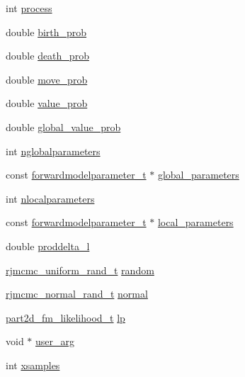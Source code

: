 \begin{DoxyCompactItemize}
\item 
int \hyperlink{structpart2dfm_af7c2d037e638e6ee8bfee2ba6af2463e}{process}
\item 
double \hyperlink{structpart2dfm_a2c88075803d90fecbd53ccc1d6dbc099}{birth\+\_\+prob}
\item 
double \hyperlink{structpart2dfm_a4f2ef201a4e7ea4b716b9a76cf04fa99}{death\+\_\+prob}
\item 
double \hyperlink{structpart2dfm_a45be675d3183f4a00bc9879c84891791}{move\+\_\+prob}
\item 
double \hyperlink{structpart2dfm_a209cacc592d391a9d18ed7efa7caaf8e}{value\+\_\+prob}
\item 
double \hyperlink{structpart2dfm_ad6751334d607033e39894444b680b37b}{global\+\_\+value\+\_\+prob}
\item 
int \hyperlink{structpart2dfm_a88681cdaf686ff60bd2f7b1313cc089f}{nglobalparameters}
\item 
const \hyperlink{forwardmodelparameter_8h_a18a7d2fd51fab097145725d83ac328e3}{forwardmodelparameter\+\_\+t} $\ast$ \hyperlink{structpart2dfm_afa1305d51cc45376446343fb6451d29f}{global\+\_\+parameters}
\item 
int \hyperlink{structpart2dfm_a0142966417b347b4ca7092912355ff8b}{nlocalparameters}
\item 
const \hyperlink{forwardmodelparameter_8h_a18a7d2fd51fab097145725d83ac328e3}{forwardmodelparameter\+\_\+t} $\ast$ \hyperlink{structpart2dfm_a74ce0287c6c2cea1fb4b4e8bf310392f}{local\+\_\+parameters}
\item 
double \hyperlink{structpart2dfm_a9bfafdf80c5638f7b413108129a968d7}{proddelta\+\_\+l}
\item 
\hyperlink{rjmcmc__random_8h_accc36e83459ada552d8f70962190dac0}{rjmcmc\+\_\+uniform\+\_\+rand\+\_\+t} \hyperlink{structpart2dfm_a4f3b1d16c58223eb6024decaf98b9e36}{random}
\item 
\hyperlink{rjmcmc__random_8h_a498625755d377b68ad37c9ab360e83b0}{rjmcmc\+\_\+normal\+\_\+rand\+\_\+t} \hyperlink{structpart2dfm_ad29ffc1189a4cad01a99f50fef2bf0ba}{normal}
\item 
\hyperlink{forwardmodel_8h_accf0a94dea281d398d639a612dcc8197}{part2d\+\_\+fm\+\_\+likelihood\+\_\+t} \hyperlink{structpart2dfm_a01e70c10872c02060c6d947d7e018be3}{lp}
\item 
void $\ast$ \hyperlink{structpart2dfm_a95b6c3d5b74b4597308839c6a6ffbea9}{user\+\_\+arg}
\item 
int \hyperlink{structpart2dfm_a6ddf3a619abe1c9eba2c8d783661829f}{xsamples}
\item 

\end{DoxyCompactItemize}
